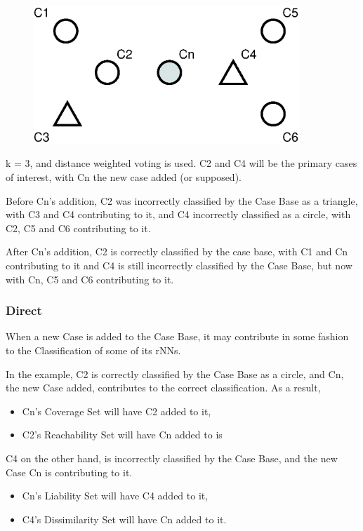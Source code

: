 \documentclass[a4paper,11pt]{report}
\begin{document}
\begin{figure}[h!] 
\centering
\includegraphics[width=10cm]{./Drawn/rNNExample}
\end{figure}

k = 3, and distance weighted voting is used. C2 and C4 will be the primary cases of interest, with Cn the new case added (or supposed).

Before Cn's addition, C2 was incorrectly classified by the Case Base as a triangle, with C3 and C4 contributing to it, and C4 incorrectly classified as a circle, with C2, C5 and C6 contributing to it.

After Cn's addition, C2 is correctly classified by the case base, with C1 and Cn contributing to it and C4 is still incorrectly classified by the Case Base, but now with Cn, C5 and C6 contributing to it.

\subsubsection{Direct}
When a new Case is added to the Case Base, it may contribute in some fashion to the Classification of some of its rNNs.

In the example, C2 is correctly classified by the Case Base as a circle, and Cn, the new Case added, contributes to the correct classification. As a result,
\begin{itemize}
	\item Cn's Coverage Set will have C2 added to it, 
	\item C2's Reachability Set will have Cn added to is
\end{itemize}

C4 on the other hand, is incorrectly classified by the Case Base, and the new Case Cn is contributing to it.
\begin{itemize}
	\item Cn's Liability Set will have C4 added to it,
	\item C4's Dissimilarity Set will have Cn added to it.
\end{itemize}
\end{document}
